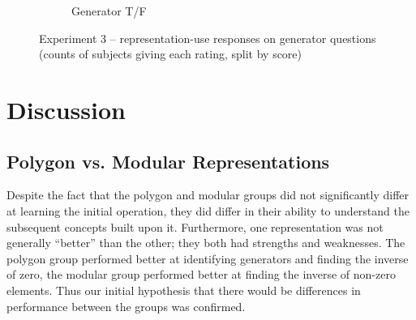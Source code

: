 \documentclass[man,10pt]{apa6}
\begin{document}
\begin{figure}
\begin{subfigure}[c]{0.45\textwidth}
\caption{Generator T/F}
\end{subfigure}
\caption{Experiment 3 -- representation-use responses on generator questions (counts of subjects giving each rating, split by score)}

\label{ex3_wr_gen}
\end{figure}
\section{Discussion}
\subsection{Polygon vs. Modular Representations}
Despite the fact that the polygon and modular groups did not significantly differ at learning the initial operation, they did differ in their ability to understand the subsequent concepts built upon it. Furthermore, one representation was not generally ``better'' than the other; they both had strengths and weaknesses. The polygon group performed better at identifying generators and finding the inverse of zero, the modular group performed better at finding the inverse of non-zero elements. Thus our initial hypothesis that there would be differences in performance between the groups was confirmed.\par 
\end{document}
